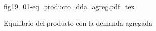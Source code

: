 \begin{figure}[h]
\centering
\def\svgwidth{0.5\textwidth}
{fig19_01-eq_producto_dda_agreg.pdf_tex}
\caption{Equilibrio del producto con la demanda agregada}
\label{fig19_01-eq_producto_dda_agreg}
\end{figure}